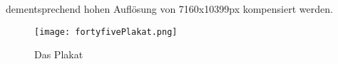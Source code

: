 dementsprechend hohen Auflösung von 7160x10399px kompensiert werden.

\begin{figure}[H]
    \centering
    \texttt{[image: fortyfivePlakat.png]}
    \caption{Das \FF Plakat}
\end{figure}

\renewcommand{\kapitelautor}{}
